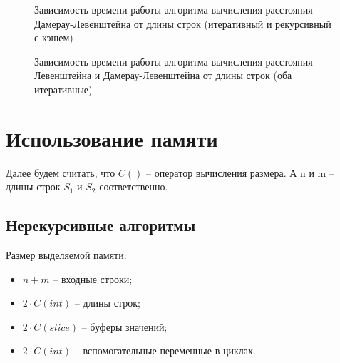 \begin{figure}[h!]
	\centering
	\captionsetup{justification=centering}
	\caption{Зависимость времени работы алгоритма вычисления расстояния Дамерау-Левенштейна от длины строк (итеративный и рекурсивный с кэшем)}
	\label{plt:iter-rec}
\end{figure}
\clearpage

\begin{figure}[h!]
	\centering
	\captionsetup{justification=centering}
	\caption{Зависимость времени работы алгоритма вычисления расстояния Левенштейна и Дамерау-Левенштейна от длины строк (оба итеративные)}
	\label{plt:l-dl}
\end{figure}

\section{Использование памяти}

Далее будем считать, что $C()$ -- оператор вычисления размера.
А n и m -- длины строк $S_1$ и $S_2$ соответственно.

\subsection{Нерекурсивные алгоритмы}

Размер выделяемой памяти:
\begin{itemize}
	\item $n + m$ -- входные строки;
	\item $2 \cdot C(int)$ -- длины строк;
	\item $2 \cdot C(slice)$ -- буферы значений;
	\item $2 \cdot C(int) $ -- вспомогательные переменные в циклах.
\end{itemize}

